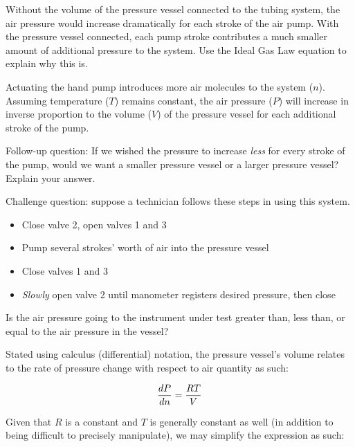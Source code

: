 Without the volume of the pressure vessel connected to the tubing system, the air pressure would increase dramatically for each stroke of the air pump.  With the pressure vessel connected, each pump stroke contributes a much smaller amount of additional pressure to the system.  Use the Ideal Gas Law equation to explain why this is.







Actuating the hand pump introduces more air molecules to the system ($n$).  Assuming temperature ($T$) remains constant, the air pressure ($P$) will increase in inverse proportion to the volume ($V$) of the pressure vessel for each additional stroke of the pump.

\vskip 10pt

Follow-up question: If we wished the pressure to increase {\it less} for every stroke of the pump, would we want a smaller pressure vessel or a larger pressure vessel?  Explain your answer.

\vskip 10pt

Challenge question: suppose a technician follows these steps in using this system.

\begin{itemize}
\item{} Close valve 2, open valves 1 and 3
\item{} Pump several strokes' worth of air into the pressure vessel
\item{} Close valves 1 and 3
\item{} {\it Slowly} open valve 2 until manometer registers desired pressure, then close
\end{itemize}

Is the air pressure going to the instrument under test greater than, less than, or equal to the air pressure in the vessel?







Stated using calculus (differential) notation, the pressure vessel's volume relates to the rate of pressure change with respect to air quantity as such:

$${dP \over dn} = {RT \over V}$$

Given that $R$ is a constant and $T$ is generally constant as well (in addition to being difficult to precisely manipulate), we may simplify the expression as such:

